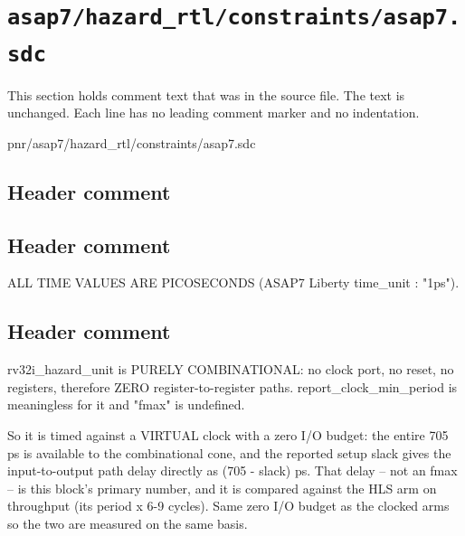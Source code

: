 \section{\texttt{asap7/hazard\_rtl/constraints/asap7.sdc}}\label{tm:pd:asap7-hazard-rtl-sdc}

This section holds comment text that was in the source file. The text is unchanged. Each line has no leading comment marker and no indentation.

\begin{relocated}{pnr/asap7/hazard_rtl/constraints/asap7.sdc}

\subsection*{Header comment}


\subsection*{Header comment}

\begin{textblock}
ALL TIME VALUES ARE PICOSECONDS (ASAP7 Liberty time_unit : "1ps").
\end{textblock}

\subsection*{Header comment}

\begin{textblock}
rv32i_hazard_unit is PURELY COMBINATIONAL: no clock port, no reset, no
registers, therefore ZERO register-to-register paths. report_clock_min_period
is meaningless for it and "fmax" is undefined.

So it is timed against a VIRTUAL clock with a zero I/O budget: the entire 705 ps
is available to the combinational cone, and the reported setup slack gives the
input-to-output path delay directly as (705 - slack) ps. That delay -- not an
fmax -- is this block's primary number, and it is compared against the HLS arm
on throughput (its period x 6-9 cycles). Same zero I/O budget as the clocked
arms so the two are measured on the same basis.
\end{textblock}

\end{relocated}


